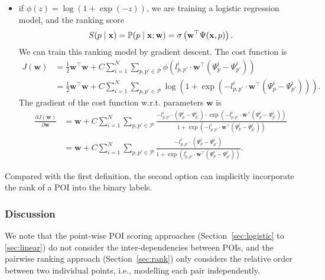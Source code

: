 \begin{itemize}
\item if $\phi(z) = \log(1 + \exp(-z))$, we are training a logistic regression model, and the ranking score
      \begin{equation*}
      S(p \mid \mathbf{x})= \mathbb{P}(p \mid \mathbf{x}; \mathbf{w}) = \sigma \left(\mathbf{w}^\top \Psi(\mathbf{x}, p) \right).
      \end{equation*}
      We can train this ranking model by gradient descent. The cost function is
      \begin{align*}
      J(\mathbf{w})
      &= \frac{1}{2} \mathbf{w}^\top \mathbf{w} +  
         C \sum_{i=1}^N \sum_{p, p' \in \mathcal{P}} \phi \left( l_{p,p'}^i \cdot \mathbf{w}^\top (\Psi_p^i - \Psi_{p'}^i) \right) \\
      &= \frac{1}{2} \mathbf{w}^\top \mathbf{w} + 
         C \sum_{i=1}^N \sum_{p, p' \in \mathcal{P}} \log\left(1 + \exp\left(-l_{p,p'}^i \cdot \mathbf{w}^\top (\Psi_p^i - \Psi_{p'}^i) \right)\right).
      \end{align*}
      The gradient of the cost function w.r.t. parameters $\mathbf{w}$ is
      \begin{align*}
      \frac{\partial J(\mathbf{w})}{\partial \mathbf{w}} 
      &= \mathbf{w} + C \sum_{i=1}^N \sum_{p, p' \in \mathcal{P}} 
         \frac{-l_{p,p'}^i \cdot (\Psi_p^i - \Psi_{p'}^i) \cdot \exp\left( -l_{p,p'}^i \cdot \mathbf{w}^\top (\Psi_p^i - \Psi_{p'}^i) \right)}
              {1 + \exp\left( -l_{p,p'}^i \cdot \mathbf{w}^\top (\Psi_p^i - \Psi_{p'}^i) \right)} \\
      &= \mathbf{w} + C \sum_{i=1}^N \sum_{p, p' \in \mathcal{P}} 
         \frac{-l_{p,p'}^i \cdot (\Psi_p^i - \Psi_{p'}^i)}{1 + \exp\left( l_{p,p'}^i \cdot \mathbf{w}^\top (\Psi_p^i - \Psi_{p'}^i) \right)}.
      \end{align*} 
\end{itemize}

      
Compared with the first definition, the second option can implicitly incorporate the rank of a POI into the binary labels.



\subsubsection{Discussion}

We note that the point-wise POI scoring approaches (Section~\ref{sec:logistic} to \ref{sec:linear}) do not consider the inter-dependencies between POIs,
and the pairwise ranking approach (Section~\ref{sec:rank}) only considers the relative order between two individual points,
i.e., modelling each pair independently.



